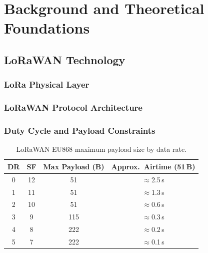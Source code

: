 \chapter{Background and Theoretical Foundations}
\label{ch:background}

\section{LoRaWAN Technology}
\label{sec:lorawan-tech}

\subsection{LoRa Physical Layer}

\subsection{LoRaWAN Protocol Architecture}

\subsection{Duty Cycle and Payload Constraints}
\begin{table}[H]
  \centering
  \begin{tabular}{cccc}
    \toprule
    \textbf{DR} & \textbf{SF} & \textbf{Max Payload (B)} & \textbf{Approx.\ Airtime (51\,B)} \\
    \midrule
    0 & 12 & 51  & $\approx$2.5\,s \\
    1 & 11 & 51  & $\approx$1.3\,s \\
    2 & 10 & 51  & $\approx$0.6\,s \\
    3 & 9  & 115 & $\approx$0.3\,s \\
    4 & 8  & 222 & $\approx$0.2\,s \\
    5 & 7  & 222 & $\approx$0.1\,s \\
    \bottomrule
  \end{tabular}
  \caption{LoRaWAN EU868 maximum payload size by data rate.}
  \label{tab:lorawan-payload}
\end{table}


